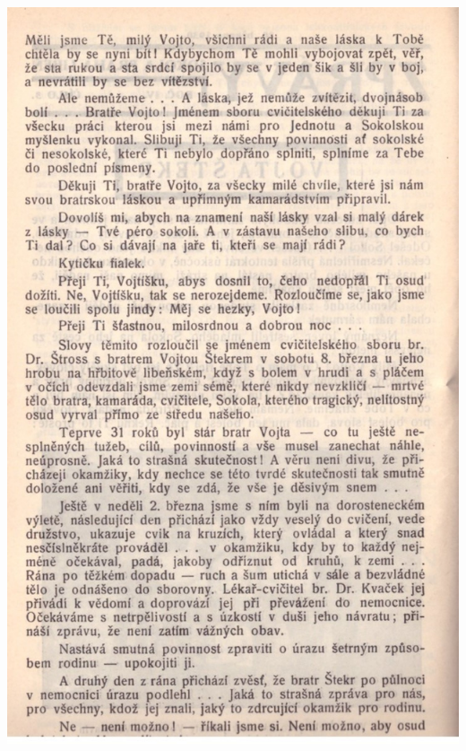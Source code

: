 \documentclass[11pt]{article}
\begin{document}
\includegraphics[width=\imagewidth]{original/1930/Skener_20250316 (8).jpg}
\end{document}
